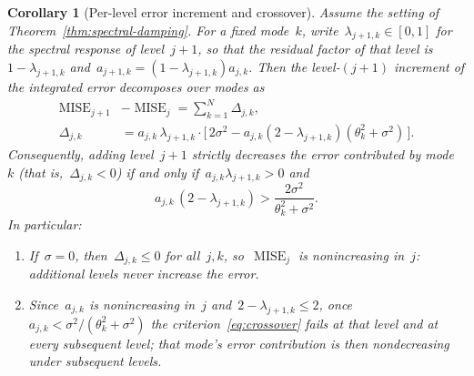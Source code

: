 \documentclass[12pt]{article}
\newtheorem{corollary}[theorem]{Corollary}
\DeclareMathOperator{\mise}{MISE}
\begin{document}
\begin{corollary}[Per-level error increment and crossover]\label{cor:mise-increment}
Assume the setting of Theorem~\ref{thm:spectral-damping}. For a fixed mode~$k$, write~$\lambda_{j+1,k}\in[0,1]$ for the spectral response of level~$j+1$, so that the residual factor of that level is~$1-\lambda_{j+1,k}$ and~$a_{j+1,k}=(1- \lambda_{j+1,k})a_{j,k}$. Then the level-$(j+1)$ increment of the integrated error decomposes over modes as
\begin{equation*}
    \begin{split}
    \mise_{j+1}&-\mise_{j}=\sum_{k=1}^N \Delta_{j,k},
    \\
    \Delta_{j,k} &= a_{j,k}\,\lambda_{j+1,k} \cdot \Big[\,2\sigma^2-a_{j,k}(2-\lambda_{j+1,k})(\theta_k^2+\sigma^2)\,\Big].
    \end{split}
\end{equation*}
Consequently, adding level~$j+1$ strictly decreases the error contributed by mode~$k$ (that is,~$\Delta_{j,k}<0$) if and only if~$a_{j,k}\lambda_{j+1,k}>0$ and 
\begin{equation}\label{eq:crossover}
    a_{j,k}\,(2 - \lambda_{j+1,k})>\frac{2\sigma^2}{\theta_k^2+\sigma^2}.
\end{equation}
In particular:
\begin{enumerate}[label=(\roman*)]
\item If~$\sigma=0$, then~$\Delta_{j,k}\le 0$ for all~$j,k$, so~$\mise_j$ is nonincreasing in~$j$: additional levels never increase the error.
\item Since~$a_{j,k}$ is nonincreasing in~$j$ and~$2-\lambda_{j+1,k}\le 2$, once $a_{j,k}<\sigma^2/(\theta_k^2+\sigma^2)$ the criterion~\eqref{eq:crossover} fails at that level and at every subsequent level; that mode's error contribution is then nondecreasing under subsequent levels.
\end{enumerate}
\end{corollary}
\end{document}
